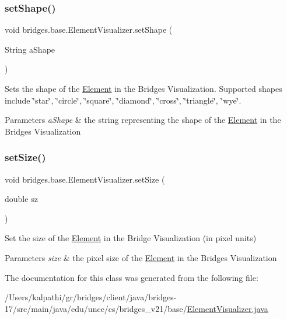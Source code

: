 \subsubsection{\texorpdfstring{set\+Shape()}{setShape()}}
{\footnotesize\ttfamily void bridges.\+base.\+Element\+Visualizer.\+set\+Shape (\begin{DoxyParamCaption}\item[{String}]{a\+Shape }\end{DoxyParamCaption})}

Sets the shape of the \mbox{\hyperlink{classbridges_1_1base_1_1_element}{Element}} in the Bridges Visualization. Supported shapes include \char`\"{}star\char`\"{}, \char`\"{}circle\char`\"{}, \char`\"{}square\char`\"{}, \char`\"{}diamond\char`\"{}, \char`\"{}cross\char`\"{}, \char`\"{}triangle\char`\"{}, \char`\"{}wye\char`\"{}.


\begin{DoxyParams}{Parameters}
{\em a\+Shape} & the string representing the shape of the \mbox{\hyperlink{classbridges_1_1base_1_1_element}{Element}} in the Bridges Visualization \\
\hline
\end{DoxyParams}
\mbox{\label{classbridges_1_1base_1_1_element_visualizer_aba410184f7df495594fc1fa7948335a5}} 
\subsubsection{\texorpdfstring{set\+Size()}{setSize()}}
{\footnotesize\ttfamily void bridges.\+base.\+Element\+Visualizer.\+set\+Size (\begin{DoxyParamCaption}\item[{double}]{sz }\end{DoxyParamCaption})}

Set the size of the \mbox{\hyperlink{classbridges_1_1base_1_1_element}{Element}} in the Bridge Visualization (in pixel units)


\begin{DoxyParams}{Parameters}
{\em size} & the pixel size of the \mbox{\hyperlink{classbridges_1_1base_1_1_element}{Element}} in the Bridges Visualization \\
\hline
\end{DoxyParams}


The documentation for this class was generated from the following file\+:\begin{DoxyCompactItemize}
\item 
/\+Users/kalpathi/gr/bridges/client/java/bridges-\/17/src/main/java/edu/uncc/cs/bridges\+\_\+v21/base/\mbox{\hyperlink{_element_visualizer_8java}{Element\+Visualizer.\+java}}\end{DoxyCompactItemize}
